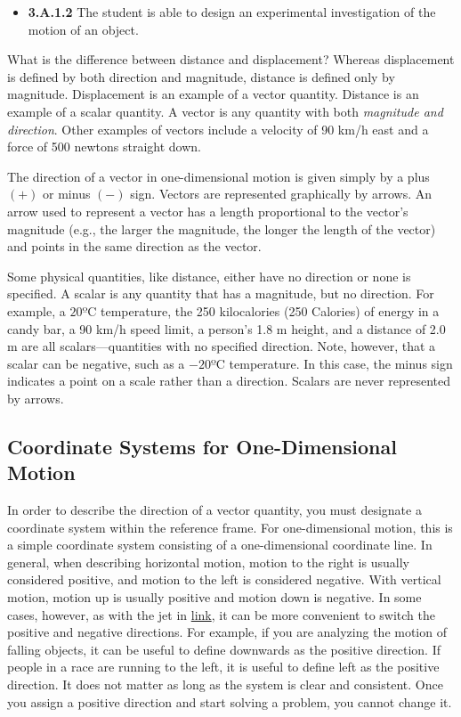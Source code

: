 \documentclass[
]{book}
\providecommand{\tightlist}{%
  \setlength{\itemsep}{0pt}\setlength{\parskip}{0pt}}
\begin{document}
\begin{itemize}
\tightlist
\item
  \textbf{3.A.1.2} The student is able to design an experimental
  investigation of the motion of an object.
\end{itemize}

What is the difference between distance and displacement? Whereas
displacement is defined by both direction and magnitude, distance is
defined only by magnitude. Displacement is an example of a vector
quantity. Distance is an example of a scalar quantity. A
\protect\hypertarget{import-auto-id1738434}{}{vector} is any quantity with
both \emph{magnitude and direction}. Other examples of vectors include a
velocity of 90 km/h east and a force of 500 newtons straight down.

The direction of a vector in one-dimensional motion is given simply by a
plus \({( + )}{}\) or minus \({( - )}{}\) sign. Vectors are represented
graphically by arrows. An arrow used to represent a vector has a length
proportional to the vector's magnitude (e.g., the larger the magnitude,
the longer the length of the vector) and points in the same direction as
the vector.

Some physical quantities, like distance, either have no direction or
none is specified. A \protect\hypertarget{import-auto-id1759638}{}{scalar}
is any quantity that has a magnitude, but no direction. For example, a
\(\text{20ºC}\) temperature, the 250 kilocalories (250 Calories) of energy
in a candy bar, a 90 km/h speed limit, a person's 1.8 m height, and a
distance of 2.0 m are all scalars---quantities with no specified
direction. Note, however, that a scalar can be negative, such as a
\(- \text{20ºC}\) temperature. In this case, the minus sign indicates a
point on a scale rather than a direction. Scalars are never represented
by arrows.

\hypertarget{fs-id1655694}{}
\hypertarget{coordinate-systems-for-one-dimensional-motion}{%
\subsection{Coordinate Systems for One-Dimensional Motion}\label{coordinate-systems-for-one-dimensional-motion}}

In order to describe the direction of a vector quantity, you must
designate a coordinate system within the reference frame. For
one-dimensional motion, this is a simple coordinate system consisting of
a one-dimensional coordinate line. In general, when describing
horizontal motion, motion to the right is usually considered positive,
and motion to the left is considered negative. With vertical motion,
motion up is usually positive and motion down is negative. In some
cases, however, as with the jet in
\protect\hyperlink{import-auto-id1778274}{link}, it can be more
convenient to switch the positive and negative directions. For example,
if you are analyzing the motion of falling objects, it can be useful to
define downwards as the positive direction. If people in a race are
running to the left, it is useful to define left as the positive
direction. It does not matter as long as the system is clear and
consistent. Once you assign a positive direction and start solving a
problem, you cannot change it.
\end{document}
